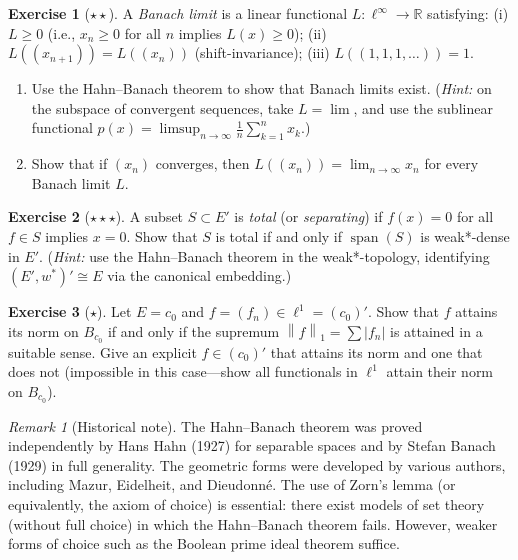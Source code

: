 \documentclass[a4paper,12pt]{book}
\DeclareMathOperator{\spn}{span}
\newcommand{\R}{\mathbb{R}}
\newcommand{\norm}[1]{\left\| #1 \right\|}
\newcommand{\abs}[1]{\left| #1 \right|}
\theoremstyle{definition}
\newtheorem{exercise}{Exercise}[chapter]
\theoremstyle{plain}
\theoremstyle{remark}
\newtheorem{remark}[definition]{Remark}
\begin{document}
\begin{exercise}[$\star\star$]\label{exo:banach-limits}
A \emph{Banach limit} is a linear functional $L\colon\ell^\infty\to\R$
satisfying: (i) $L\geq 0$ (i.e., $x_n\geq 0$ for all $n$ implies $L(x)\geq 0$);
(ii) $L((x_{n+1}))=L((x_n))$ (shift-invariance);
(iii) $L((1,1,1,\dots))=1$.
\begin{enumerate}[label=(\alph*)]
  \item Use the Hahn--Banach theorem to show that Banach limits exist.
        (\emph{Hint:} on the subspace of convergent sequences, take $L = \lim$,
        and use the sublinear functional $p(x) = \limsup_{n\to\infty}\frac{1}{n}
        \sum_{k=1}^{n}x_k$.)
  \item Show that if $(x_n)$ converges, then $L((x_n))=\lim_{n\to\infty}x_n$
        for every Banach limit $L$.
\end{enumerate}
\end{exercise}

\begin{exercise}[$\star\star\star$]\label{exo:total-subsets}
A subset $S\subset E'$ is \emph{total} (or \emph{separating}) if $f(x)=0$ for
all $f\in S$ implies $x=0$. Show that $S$ is total if and only if $\spn(S)$ is
weak*-dense in $E'$. (\emph{Hint:} use the Hahn--Banach theorem in the
weak*-topology, identifying $(E',w^*)' \cong E$ via the canonical embedding.)
\end{exercise}

\begin{exercise}[$\star$]\label{exo:norm-attaining}
Let $E=c_0$ and $f=(f_n)\in\ell^1=(c_0)'$. Show that $f$ attains its norm
on $B_{c_0}$ if and only if the supremum $\norm{f}_1=\sum\abs{f_n}$ is
attained in a suitable sense. Give an explicit $f\in(c_0)'$ that attains its
norm and one that does not (impossible in this case---show all functionals in
$\ell^1$ attain their norm on $B_{c_0}$).
\end{exercise}

\begin{remark}[Historical note]\label{rem:HB-history}
The Hahn--Banach theorem was proved independently by Hans Hahn (1927) for
separable spaces and by Stefan Banach (1929) in full generality. The geometric
forms were developed by various authors, including Mazur, Eidelheit, and
Dieudonn\'e. The use of Zorn's lemma (or equivalently, the axiom of choice)
is essential: there exist models of set theory (without full choice) in which
the Hahn--Banach theorem fails. However, weaker forms of choice such as the
Boolean prime ideal theorem suffice.
\end{remark}
\end{document}
